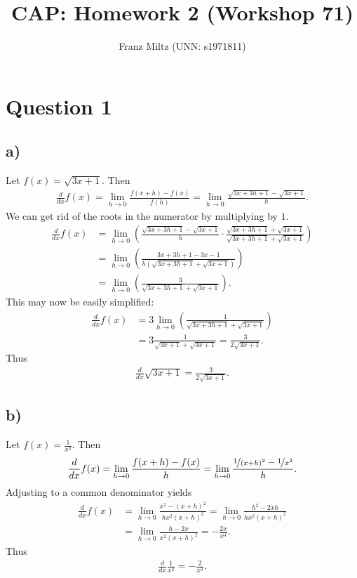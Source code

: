 \documentclass{article}
\title{CAP: Homework 2 (Workshop 71)}
\author{Franz Miltz (UNN: s1971811)}
\begin{document}
\maketitle
\section*{Question 1}
\subsection*{a)}
Let $f(x)=\sqrt{3x+1}$. Then
\begin{align*}
  \frac{d}{dx}f(x)=\lim_{h\to0}\frac{f(x+h)-f(x)}{f(h)}
  =\lim_{h\to0}\frac{\sqrt{3x+3h+1}-\sqrt{3x+1}}{h}.
\end{align*}
We can get rid of the roots in the numerator by multiplying by $1$.
\begin{align*}
  \frac{d}{dx}f(x)&=\lim_{h\to0}\left(\frac{\sqrt{3x+3h+1}-\sqrt{3x+1}}{h}\cdot\frac{\sqrt{3x+3h+1}+\sqrt{3x+1}}{\sqrt{3x+3h+1}+\sqrt{3x+1}}\right)\\
  &=\lim_{h\to0}\left(\frac{3x+3h+1-3x-1}{h(\sqrt{3x+3h+1}+\sqrt{3x+1})}\right)\\
  &=\lim_{h\to0}\left(\frac{3}{\sqrt{3x+3h+1}+\sqrt{3x+1}}\right).
\end{align*}
This may now be easily simplified:
\begin{align*}
  \frac{d}{dx}f(x)&= 3\lim_{h\to0}\left(\frac{1}{\sqrt{3x+3h+1}+\sqrt{3x+1}}\right)\\
  &=3\frac{1}{\sqrt{3x+1}+\sqrt{3x+1}}=\frac{3}{2\sqrt{3x+1}}.
\end{align*}
Thus
\begin{align*}
  \frac{d}{dx}\sqrt{3x+1}=\frac{3}{2\sqrt{3x+1}}.
\end{align*}
\subsection*{b)}
Let $f(x)=\frac{1}{x^2}$. Then
\begin{align*}
  \frac{d}{dx}f(x)=\lim_{h\to0}\frac{f(x+h)-f(x)}{h}=\lim_{h\to0}\frac{\nicefrac{1}{(x+h)^2}-\nicefrac{1}{x^2}}{h}.
\end{align*}
Adjusting to a common denominator yields
\begin{align*}
  \frac{d}{dx}f(x)&=\lim_{h\to0}\frac{x^2-(x+h)^2}{hx^2(x+h)^2}
  =\lim_{h\to0}\frac{h^2-2xh}{hx^2(x+h)^2}\\
  &=\lim_{h\to0}\frac{h-2x}{x^2(x+h)^2}=-\frac{2x}{x^4}.
\end{align*}
Thus
\begin{align*}
  \frac{d}{dx}\frac{1}{x^2}=-\frac{2}{x^3}.
\end{align*}
\end{document}
